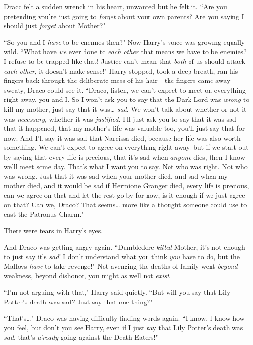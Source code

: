 Draco felt a sudden wrench in his heart, unwanted but he felt it. ``Are you pretending you're just going to \emph{forget} about your own parents? Are you saying I should just \emph{forget} about Mother?"

``So you and I \emph{have} to be enemies then?" Now Harry's voice was growing equally wild. ``What have \emph{we} ever done to \emph{each other} that means we have to be enemies? I refuse to be trapped like that! Justice can't mean that \emph{both} of us should attack \emph{each other}, it doesn't make sense!" Harry stopped, took a deep breath, ran his fingers back through the deliberate mess of his hair—the fingers came away sweaty, Draco could see it. ``Draco, listen, we can't expect to meet on everything right away, you and I\@. So I won't ask you to say that the Dark Lord was \emph{wrong} to kill my mother, just say that it was{\ldots} \emph{sad}. We won't talk about whether or not it was \emph{necessary}, whether it was \emph{justified}. I'll just ask you to say that it was sad that it happened, that my mother's life was valuable too, you'll just say that for now. And I'll say it was sad that Narcissa died, because her life was also worth something. We can't expect to agree on everything right away, but if we start out by saying that every life is precious, that it's sad when \emph{anyone} dies, then I know we'll meet some day. That's what I want you to say. Not who was right. Not who was wrong. Just that it was sad when your mother died, and sad when my mother died, and it would be sad if Hermione Granger died, every life is precious, can we agree on that and let the rest go by for now, is it enough if we just agree on that? Can we, Draco? That seems{\ldots} more like a thought someone could use to cast the Patronus Charm."

There were tears in Harry's eyes.

And Draco was getting angry again. ``Dumbledore \emph{killed} Mother, it's not enough to just say it's \emph{sad}! I don't understand what you think \emph{you} have to do, but the Malfoys \emph{have} to take revenge!" Not avenging the deaths of family went \emph{beyond} weakness, beyond dishonor, you might as well not \emph{exist}.

``I'm not arguing with that," Harry said quietly. ``But will you say that Lily Potter's death was sad? Just say that one thing?"

``That's{\ldots}" Draco was having difficulty finding words again. ``I know, I know how you feel, but don't you see Harry, even if I just say that Lily Potter's death was \emph{sad}, that's \emph{already} going against the Death Eaters!"

